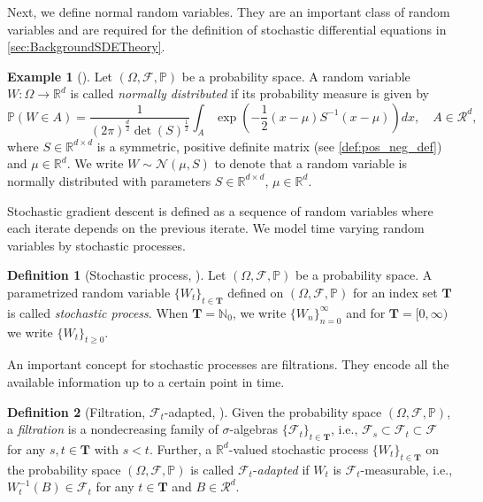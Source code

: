 \documentclass[12pt]{article}
\theoremstyle{definition}
\newtheorem{example}[example]{Example}
\newtheorem{definition}[definition]{Definition}
\numberwithin{equation}{section}
\newcommand{\N}{\mathbb{N}}
\newcommand{\R}{\mathbb{R}}
\newcommand{\BP}{\mathbb{P}}
\newcommand{\CF}{\mathcal{F}}
\newcommand{\CN}{\mathcal{N}}
\begin{document}
 Next, we define normal random variables. They are an important class of random variables and are required for the definition of stochastic differential equations in \autoref{sec:BackgroundSDETheory}.
 \begin{example}[]
  Let $(\Omega, \CF, \BP)$ be a probability space. A random variable $W : \Omega \rightarrow \R^d$ is called \emph{normally distributed} if its probability measure is given by
  \begin{equation*}
    \BP(W \in A) = \frac{1}{(2 \pi)^\frac{d}{2} \det(S)^\frac{1}{2}} \int_A \exp\left(-\frac{1}{2}(x-\mu)S^{-1}(x-\mu)\right)dx, \quad A \in \mathcal{R}^d,
  \end{equation*}
  where $S \in \R^{d \times d}$ is a symmetric, positive definite matrix (see \autoref{def:pos_neg_def}) and $\mu \in \R^d$. We write $W \sim \CN(\mu, S)$ to denote that a random variable is normally distributed with parameters $S \in \R^{d \times d}$, $\mu \in \R^d$.
 \end{example}
 Stochastic gradient descent is defined as a sequence of random variables where each iterate depends on the previous iterate. We model time varying random variables by stochastic processes.
 \begin{definition}[Stochastic process, ]
  Let $(\Omega, \CF, \BP)$ be a probability space. A parametrized random variable $\{W_t\}_{t \in \bm{T}}$ defined on $(\Omega, \CF, \BP)$ for an index set $\bm{T}$ is called \emph{stochastic process}. When $\bm{T} = \N_0$, we write $\{W_n\}_{n=0}^\infty$ and for $\bm{T} = [0,\infty)$ we write $\{W_t\}_{t \geq 0}$.
 \end{definition}
 An important concept for stochastic processes are filtrations. They encode all the available information up to a certain point in time.
 \begin{definition}[Filtration, $\CF_t$-adapted, ]
   Given the probability space $(\Omega, \CF, \BP)$, a \emph{filtration} is a nondecreasing family of $\sigma$-algebras $\{\CF_t\}_{t\in \mathbf{T}}$, i.e., $\CF_s \subset \CF_t \subset \CF$ for any $s,t \in \mathbf{T}$ with $s < t$. Further, a $\R^d$-valued stochastic process $\{W_t\}_{t \in \mathbf{T}}$ on the probability space  $(\Omega, \CF, \BP)$ is called $\CF_t$-\emph{adapted} if $W_t$ is $\CF_t$-measurable, i.e., $W_t^{-1}(B) \in \CF_t$ for any $t \in \mathbf{T}$ and $B \in \mathcal{R}^d$.
 \end{definition}
\end{document}
